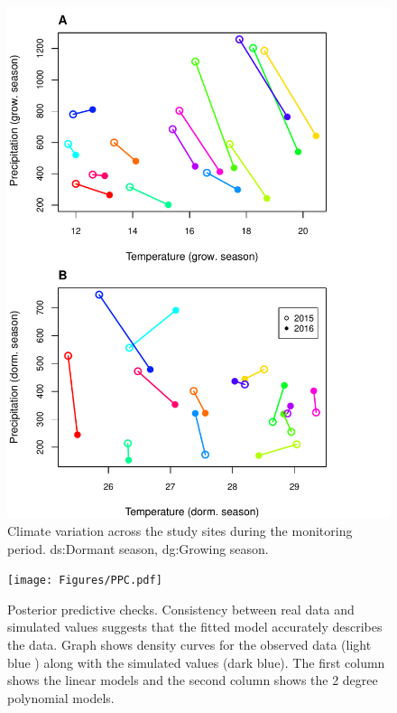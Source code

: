 \documentclass[12pt]{article}
\begin{document}
\begin{figure}[H]
		\centering
		\includegraphics[width=0.959\linewidth]{Figures/site_year_weather.pdf}
		\caption{Climate variation across the study sites during the monitoring period.
		ds:Dormant season, dg:Growing season.}
		\label{Sup:climate_variation}
\end{figure}

	
\begin{figure}[H]
		\centering
		\texttt{[image: Figures/PPC.pdf]}
		\caption{Posterior predictive checks. Consistency between real data and simulated values suggests that the fitted model accurately describes the data. Graph shows density curves for the observed data (light blue ) along with the simulated values (dark blue). The first column shows the linear models and the second column shows the 2 degree polynomial models.}
		\label{Sup:PPC}
	\end{figure}
	
\end{document}
